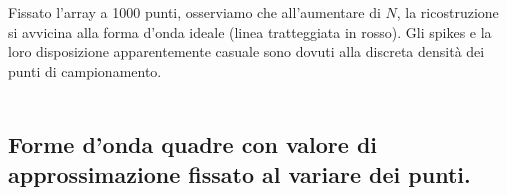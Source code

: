 \documentclass[10pt,a4paper]{article}
\begin{document}
Fissato l'array a 1000 punti, osserviamo che all'aumentare di \(N\), la ricostruzione si avvicina alla forma d'onda ideale (linea tratteggiata in rosso). Gli spikes e la loro disposizione apparentemente casuale sono dovuti alla discreta densità dei punti di campionamento.
\\\\ 


\newpage
\subsection{Forme d'onda quadre con valore di approssimazione fissato al variare dei punti.}

\begin{figure}[H]
	\vspace{-0.3cm}
    \centering
    \vspace{-0.6cm}
\end{figure}
\end{document}
